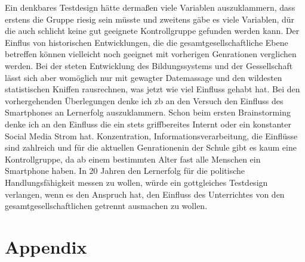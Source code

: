 Ein denkbares Testdesign hätte dermaßen viele Variablen auszuklammern, dass erstens die Gruppe riesig sein müsste und zweitens gäbe es viele Variablen, dür die auch schlicht keine gut geeignete Kontrollgruppe gefunden werden kann. Der Einflus von historischen Entwicklungen, die die gesamtgesellschaftliche Ebene betreffen können vielleicht noch geeignet mit vorherigen Genrationen verglichen werden. Bei der steten Entwicklung des Bildungssystems und der Gessellschaft lässt sich aber womöglich nur mit gewagter Datemassage und den wildesten statistischen Kniffen rausrechnen, was jetzt wie viel Einfluss gehabt hat. 
Bei den vorhergehenden Überlegungen denke ich \gls{zb} an den Versuch den Einfluss des Smartphones an Lernerfolg auszuklammern. Schon beim ersten Brainstorming denke ich an den Einfluss die ein stets griffbereites Internt oder ein konstanter Social Media Strom hat. Konzentration, Informationsverarbeitung, die Einflüsse sind zahlreich und für die aktuellen Genrationenin der Schule gibt es kaum eine Kontrollgruppe, da ab einem bestimmten Alter fast alle Menschen ein Smartphone haben. In 20 Jahren den Lernerfolg für die politische Handlungsfähigkeit messen zu wollen, würde ein gottgleiches Testdesign verlangen, wenn es den Anspruch hat, den Einfluss des Unterrichtes von den gesamtgesellschaftlichen getrennt ausmachen zu wollen. 







\clearpage
\newpage
\printbibliography[title=Literaturverzeichnis, heading=bibintoc, nottype=unused] 

\appendix %

\section{Appendix}
